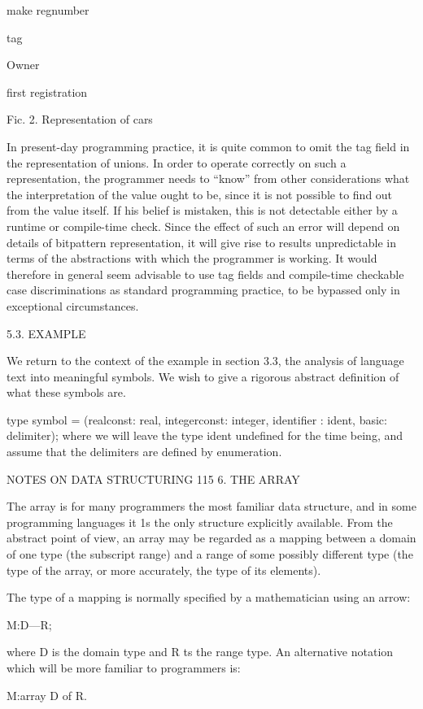 {	
	make regnumber
	
	tag
	
	Owner
	
	first registration
	
	
	
	Fic. 2. Representation of cars
	
	In present-day programming practice, it is quite common to omit the tag field in the representation of unions. In order to operate correctly on such a representation, the programmer needs to “know” from other considerations what the interpretation of the value ought to be, since it is not possible to find out from the value itself. If his belief is mistaken, this is not detectable either by a runtime or compile-time check. Since the effect of such an error will depend on details of bitpattern representation, it will give rise to results unpredictable in terms of the abstractions with which the programmer is working. It would therefore in general seem advisable to use tag fields and compile-time checkable case discriminations as standard programming practice, to be bypassed only in exceptional circumstances.
	
	5.3. EXAMPLE
	
	We return to the context of the example in section 3.3, the analysis of language text into meaningful symbols. We wish to give a rigorous abstract definition of what these symbols are.
	
	type symbol = (realconst: real, integerconst: integer, identifier : ident, basic: delimiter); where we will leave the type ident undefined for the time being, and assume that the delimiters are defined by enumeration.
	
	NOTES ON DATA STRUCTURING 115 6. THE ARRAY
	
	The array is for many programmers the most familiar data structure, and in some programming languages it 1s the only structure explicitly available. From the abstract point of view, an array may be regarded as a mapping between a domain of one type (the subscript range) and a range of some possibly different type (the type of the array, or more accurately, the type of its elements).
	
	The type of a mapping is normally specified by a mathematician using an arrow:
	
	M:D—R;
	
	where D is the domain type and R ts the range type. An alternative notation which will be more familiar to programmers is:
	
	M:array D of R.
	
}
